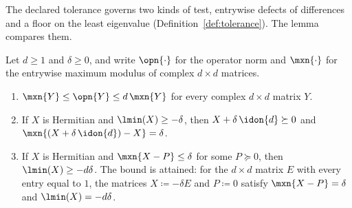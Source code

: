 
The declared tolerance governs two kinds of test, entrywise defects of
differences and a floor on the least eigenvalue
(Definition~\ref{def:tolerance}). The lemma compares them.

\begin{lemma}\label{lem:floor-stricter}
Let $d\ge1$ and $\delta\ge0$, and write $\opn{\cdot}$ for the operator norm and
$\mxn{\cdot}$ for the entrywise maximum modulus of complex $d\times d$
matrices.
\begin{enumerate}[label=(\roman*),leftmargin=2.4em]
\item $\mxn{Y}\le\opn{Y}\le d\,\mxn{Y}$ for every complex $d\times d$
  matrix $Y$.
\item If $X$ is Hermitian and $\lmin(X)\ge-\delta$, then
  $X+\delta\,\idon{d}\succeq0$ and
  $\mxn{(X+\delta\,\idon{d})-X}=\delta$.
\item If $X$ is Hermitian and $\mxn{X-P}\le\delta$ for some $P\succeq0$, then
  $\lmin(X)\ge-d\delta$. The bound is attained: for the $d\times d$ matrix $E$
  with every entry equal to $1$, the matrices $X\coloneqq-\delta E$ and
  $P\coloneqq0$ satisfy $\mxn{X-P}=\delta$ and $\lmin(X)=-d\delta$.
\end{enumerate}
\end{lemma}

